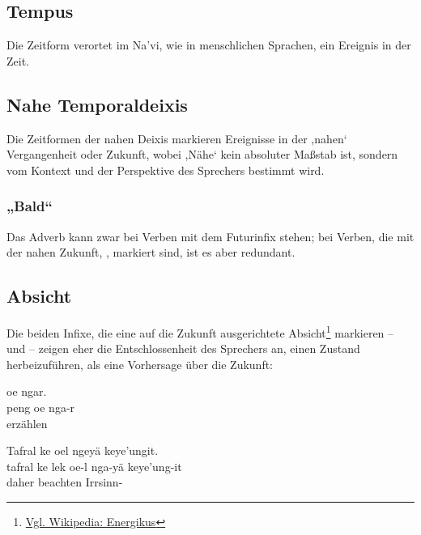 \subsection{Tempus} Die Zeitform verortet im Na'vi, wie in menschlichen Sprachen, ein Ereignis in der Zeit.


\subsection{Nahe Temporaldeixis} Die Zeitformen der nahen Deixis markieren Ereignisse in der ,nahen‘ Vergangenheit oder Zukunft, wobei ,Nähe‘ kein absoluter Maßstab ist, sondern vom Kontext und der Perspektive des Sprechers bestimmt wird.

\subsubsection{„Bald“} Das Adverb   kann zwar bei Verben mit dem Futurinfix  stehen; bei Verben, die mit der nahen Zukunft, , markiert sind, ist es aber redundant.

\subsection{Absicht} Die beiden Infixe, die eine auf die Zukunft ausgerichtete Absicht\footnote{\href{https://de.wikipedia.org/wiki/Energikus}{Vgl. Wikipedia: Energikus}} markieren --  und  -- zeigen eher die Entschlossenheit des Sprechers an, einen Zustand herbeizuführen, als eine Vorhersage über die Zukunft: 

\begin{interlin}
	\glll \Npawl{} oe ngar. \\
	peng oe nga-r \\
	erzählen   \\
\end{interlin}

\begin{interlin}
	\glll \Npawl{}Tafral ke  oel ngeyä keye'ungit. \\
	tafral ke lek oe-l nga-yä keye'ung-it \\
	daher  beachten   Irrsinn- \\
\end{interlin}

